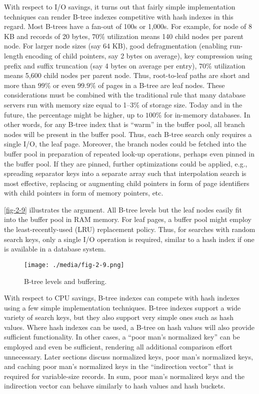 With respect to I/O savings, it turns out that fairly simple
implementation techniques can render B-tree indexes competitive with
hash indexes in this regard. Most B-trees have a fan-out of 100s or
1,000s. For example, for node of 8 KB and records of 20 bytes, $70\%$
utilization means 140 child nodes per parent node. For larger node sizes
(say 64 KB), good defragmentation (enabling run-length encoding of child
pointers, say 2 bytes on average), key compression using prefix and
suffix truncation (say 4 bytes on average per entry), $70\%$ utilization
means 5,600 child nodes per parent node. Thus, root-to-leaf paths are
short and more than $99\%$ or even $99.9\%$ of pages in a B-tree are leaf
nodes. These considerations must be combined with the traditional rule
that many database servers run with memory size equal to 1--3\% of
storage size. Today and in the future, the percentage might be higher,
up to $100\%$ for in-memory databases. In other words, for any B-tree
index that is ``warm'' in the buffer pool, all branch nodes will be
present in the buffer pool. Thus, each B-tree search only requires a
single I/O, the leaf page. Moreover, the branch nodes could be fetched
into the buffer pool in preparation of repeated look-up operations,
perhaps even pinned in the buffer pool. If they are pinned, further
optimizations could be applied, e.g., spreading separator keys into a
separate array such that interpolation search is most effective,
replacing or augmenting child pointers in form of page identifiers with
child pointers in form of memory pointers, etc.

\autoref{fig-2-9} illustrates the argument. All B-tree levels but the leaf
nodes easily fit into the buffer pool in RAM memory. For leaf pages, a
buffer pool might employ the least-recently-used (LRU) replacement
policy. Thus, for searches with random search keys, only a single I/O
operation is required, similar to a hash index if one is available in a
database system.

\begin{figure}
  \centering
  \texttt{[image: ./media/fig-2-9.png]}

  \caption{B-tree levels and buffering.\label{fig-2-9}}
\end{figure}

With respect to CPU savings, B-tree indexes can compete with hash
indexes using a few simple implementation techniques. B-tree indexes
support a wide variety of search keys, but they also support very simple
ones such as hash values. Where hash indexes can be used, a B-tree on
hash values will also provide sufficient functionality. In other cases,
a ``poor man's normalized key'' can be employed and even be sufficient,
rendering all additional comparison effort unnecessary. Later sections
discuss normalized keys, poor man's normalized keys, and caching poor
man's normalized keys in the ``indirection vector'' that is required for
variable-size records. In sum, poor man's normalized keys and the
indirection vector can behave similarly to hash values and hash buckets.

